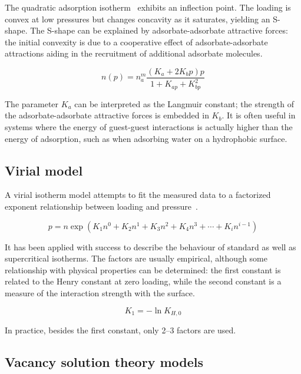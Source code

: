 The quadratic adsorption
isotherm~\cite{hillIntroductionStatisticalThermodynamics1986}
exhibits an inflection point. The loading is convex at low
pressures but changes concavity as it saturates, yielding
an S-shape. The S-shape can be explained by adsorbate-adsorbate
attractive forces: the initial convexity is due to a cooperative
effect of adsorbate-adsorbate attractions aiding in the recruitment
of additional adsorbate molecules.

\begin{equation}\label{pyg:eqn:quad}
	n(p) = n_a^m \frac{(K_a + 2 K_b p)p}{1+K_{ap} + K_{bp}^2}
\end{equation}

The parameter \(K_a\) can be interpreted as the Langmuir constant;
the strength of the adsorbate-adsorbate attractive forces is 
embedded in \(K_b\). It is often useful in systems where the 
energy of guest-guest interactions is actually higher than
the energy of adsorption, such as when adsorbing water 
on a hydrophobic surface.

\subsection{Virial model}\label{pyg:models:virial}

A virial isotherm model attempts to fit the measured data to a
factorized exponent relationship between loading and
pressure~\cite{myersThermodynamicsAdsorptionPorous2002}.

\begin{equation}\label{pyg:eqn:virial}
	p = n \exp{(K_1n^0 + K_2n^1 + K_3n^2 + K_4n^3 + \cdots + K_i
		n^{i-1})}
\end{equation}

It has been applied with success to describe the behaviour of
standard as well as supercritical isotherms. The factors are 
usually empirical, although some relationship with physical 
properties can be determined:
the first constant is related to the Henry constant at
zero loading, while the second constant is a measure of the 
interaction strength with the surface.

\begin{equation}
	K_1 = -\ln{K_{H,0}}
\end{equation}

In practice, besides the first constant, only 2--3 factors are used.

\subsection{Vacancy solution theory models}\label{pyg:models:vst}

